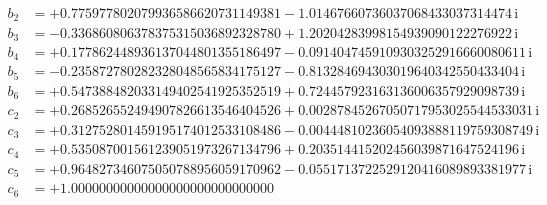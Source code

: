 {\begin{align*}
b_{2} &= +0.775977802079936586620731149381 - 1.01467660736037068433037314474\,\mathrm{i}\\
b_{3} &= -0.336860806378375315036892328780 + 1.20204283998154939090122276922\,\mathrm{i}\\
b_{4} &= +0.177862448936137044801355186497 - 0.0914047459109303252916660080611\,\mathrm{i}\\
b_{5} &= -0.235872780282328048565834175127 - 0.813284694303019640342550433404\,\mathrm{i}\\
b_{6} &= +0.547388482033149402541925352519 + 0.724457923163136006357929098739\,\mathrm{i}\\[1mm]
c_{2} &= +0.268526552494907826613546404526 + 0.00287845267050717953025544533031\,\mathrm{i}\\
c_{3} &= +0.312752801459195174012533108486 - 0.00444810236054093888119759308749\,\mathrm{i}\\
c_{4} &= +0.535087001561239051973267134796 + 0.203514415202456039871647524196\,\mathrm{i}\\
c_{5} &= +0.964827346075050788956059170962 - 0.0551713722529120416089893381977\,\mathrm{i}\\
c_{6} &= +1.00000000000000000000000000000
\end{align*}
}

